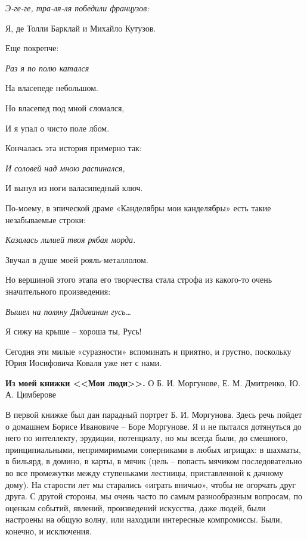 \indent

{\itshape
	Э-ге-ге, тра-ля-ля победили французов:
	
	Я, де Толли Барклай и Михайло Кутузов.
}

\indent

\noindent
Еще покрепче:

\indent

{\itshape
	Раз я по полю катался
	
	На власепеде небольшом.
	
	Но власепед под мной сломался,
	
	И я упал о чисто поле лбом.
}

\vfill

\noindent
Кончалась эта история примерно так:

\vfill

{\itshape
	И соловей над мною распинался,
	
	И вынул из ноги валасипедный ключ.	
}	

\indent

\noindent
По-моему, в эпической драме «Канделябры мои канделябры» есть такие незабываемые строки:

\indent

{\itshape
Казалась лилией твоя рябая морда.

Звучал в душе моей рояль-металлолом.
}

\indent

\noindent
Но вершиной этого этапа его творчества стала строфа из какого-то очень значительного произведения:

\indent

{\itshape
	Вышел на поляну Дядиванин гусь…
	
	Я сижу на крыше – хороша ты, Русь!
}

\indent

Сегодня эти милые «суразности» вспоминать и приятно, и грустно, поскольку Юрия Иосифовича Коваля уже нет с нами.

\indent

\textbf{Из моей книжки <<Мои люди>>.} О Б. И. Моргунове, Е. М. Дмитренко, Ю. А. Цимберове

В первой книжке был дан парадный портрет Б. И. Моргунова. Здесь речь пойдет о домашнем Борисе Ивановиче – Боре Моргунове. Я и не пытался дотянуться до него по интеллекту, эрудиции, потенциалу, но мы всегда были, до смешного, принципиальными, непримиримыми соперниками в любых игрищах: в шахматы, в бильярд, в домино, в карты, в мячик (цель – попасть мячиком последовательно во все промежутки между ступеньками лестницы, приставленной к дачному дому). На старости лет мы старались «играть вничью», чтобы не огорчать друг друга. С другой стороны, мы очень часто по самым разнообразным вопросам, по оценкам событий, явлений, произведений искусства, даже людей, были настроены на общую волну, или находили интересные компромиссы. Были, конечно, и исключения. 
	
